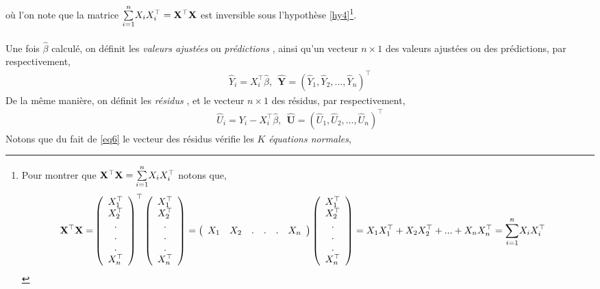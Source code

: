 où l'on note que la matrice $\underset{i=1}{\overset{n}{\sum}} X_iX_i^\top = \mathbf{X}^\top\mathbf{X}$ est inversible sous l'hypothèse \ref{hy4}\footnote{Pour montrer que 
$\mathbf{X}^\top\mathbf{X} = \underset{i=1}{\overset{n}{\sum}} X_iX_i^\top$ notons que,
\begin{align*}
\mathbf{X}^\top\mathbf{X}=&
\left(
\begin{array}{c}
X_1^\top\\
X_2^\top\\
.\\
.\\
.\\
X_n^\top
\end{array}
\right)^\top
\left(
\begin{array}{c}
X_1^\top\\
X_2^\top\\
.\\
.\\
.\\
X_n^\top
\end{array}
\right)
= 
\left(
\begin{array}{cccccc}
X_1&X_2&.&.&.&X_n
\end{array}
\right)
\left(
\begin{array}{c}
X_1^\top\\
X_2^\top\\
.\\
.\\
.\\
X_n^\top
\end{array}
\right)
= X_1X_1^\top + X_2X_2^\top+...+X_nX_n^\top
=\underset{i=1}{\overset{n}{\sum}} X_iX_i^\top
\end{align*}

}.\\\\
Une fois $\widehat{\beta}$ calculé, on définit les \emph{valeurs ajustées} ou \emph{prédictions} , ainsi qu'un vecteur $n\times 1$ des valeurs ajustées ou des prédictions, par respectivement,
\begin{align*}
\widehat{Y}_i = X_i^\top\widehat{\beta}, \ \ \widehat{\mathbf{Y}} = (\widehat{Y}_1,  \widehat{Y}_2,..., \widehat{Y}_n)^\top
\end{align*}
De la même manière, on définit  les \emph{résidus}  , et le vecteur  $n\times 1$ des résidus, par respectivement,
\begin{align*}
\widehat{U}_i = Y_i - X_i^\top\widehat{\beta}, \ \ \widehat{\mathbf{U}} = (\widehat{U}_1,  \widehat{U}_2,..., \widehat{U}_n)^\top
\end{align*}
Notons que du fait de \eqref{eq6} le vecteur des résidus vérifie les $K$  \emph{équations normales},
